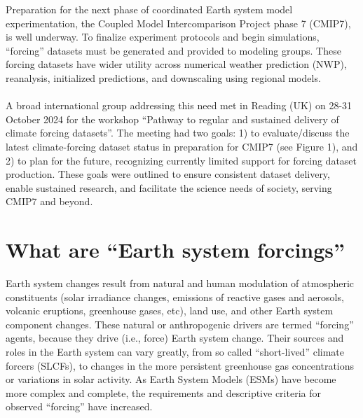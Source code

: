 \documentclass{ametsocV6.1}
\begin{document}

Preparation for the next phase of coordinated Earth system model experimentation, the Coupled Model Intercomparison Project phase 7 (CMIP7), is well underway. To finalize experiment protocols and begin simulations, ``forcing'' datasets must be generated and provided to modeling groups. These forcing datasets have wider utility across numerical weather prediction (NWP), reanalysis, initialized predictions, and downscaling using regional models. \\ 
\\
A broad international group addressing this need met in Reading (UK) on 28-31 October 2024 for the workshop ``Pathway to regular and sustained delivery of climate forcing datasets''. The meeting had two goals: 1) to evaluate/discuss the latest climate-forcing dataset status in preparation for CMIP7 (see Figure 1), and 2) to plan for the future, recognizing currently limited support for forcing dataset production. These goals were outlined to ensure consistent dataset delivery, enable sustained research, and facilitate the science needs of society, serving CMIP7 and beyond.

\section*{What are ``Earth system forcings''}
Earth system changes result from natural and human modulation of atmospheric constituents (solar irradiance changes, emissions of reactive gases and aerosols, volcanic eruptions, greenhouse gases, etc), land use, and other Earth system component changes. These natural or anthropogenic drivers are termed ``forcing'' agents, because they drive (i.e., force) Earth system change. Their sources and roles in the Earth system can vary greatly, from so called ``short-lived'' climate forcers (SLCFs), to changes in the more persistent greenhouse gas concentrations or variations in solar activity. As Earth System Models (ESMs) have become more complex and complete, the requirements and descriptive criteria for observed ``forcing'' have increased.
\end{document}
